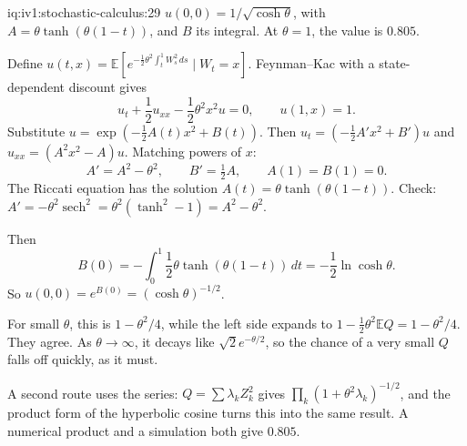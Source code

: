 \begin{solution}{iq:iv1:stochastic-calculus:29}
$u(0, 0) = 1/\sqrt{\cosh\theta}$, with $A = \theta\tanh(\theta(1 - t))$, and $B$ its integral. At $\theta = 1$, the value is $0.805$.

Define $u(t, x) = \mathbb{E}[e^{-\frac12\theta^2\int_t^1W_s^2\,ds} \mid W_t = x]$. Feynman--Kac with a state-dependent discount gives
\[
u_t + \frac12u_{xx} - \frac12\theta^2x^2u = 0, \qquad u(1, x) = 1.
\]
Substitute $u = \exp(-\frac12A(t)x^2 + B(t))$. Then $u_t = (-\frac12A'x^2 + B')u$ and $u_{xx} = (A^2x^2 - A)u$. Matching powers of $x$:
\[
A' = A^2 - \theta^2, \qquad B' = \tfrac12A, \qquad A(1) = B(1) = 0.
\]
The Riccati equation has the solution $A(t) = \theta\tanh(\theta(1 - t))$. Check: $A' = -\theta^2\operatorname{sech}^2 = \theta^2(\tanh^2 - 1) = A^2 - \theta^2$.

Then
\[
B(0) = -\int_0^1\frac12\theta\tanh(\theta(1 - t))\,dt = -\frac12\ln\cosh\theta.
\]
So $u(0, 0) = e^{B(0)} = (\cosh\theta)^{-1/2}$.

For small $\theta$, this is $1 - \theta^2/4$, while the left side expands to $1 - \frac12\theta^2\mathbb{E}Q = 1 - \theta^2/4$. They agree. As $\theta \to \infty$, it decays like $\sqrt{2}e^{-\theta/2}$, so the chance of a very small $Q$ falls off quickly, as it must.

A second route uses the series: $Q = \sum\lambda_kZ_k^2$ gives $\prod_k(1 + \theta^2\lambda_k)^{-1/2}$, and the product form of the hyperbolic cosine turns this into the same result. A numerical product and a simulation both give $0.805$.



\end{solution}

